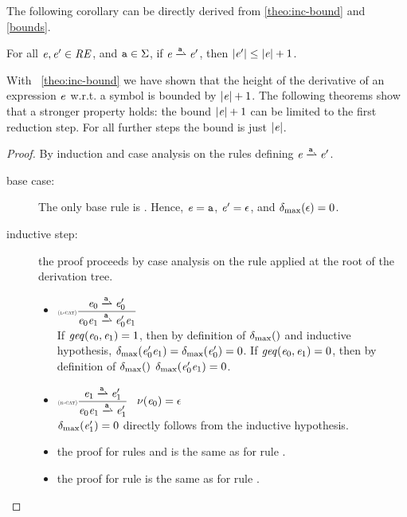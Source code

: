 The following corollary can be directly derived from \cref{theo:inc-bound} and \cref{bounds}.
\begin{corollary}
 For all $\mathit {e},\mathit {e}'\in\mathit {RE}$, and $\mathtt {a}\in\Sigma$, if $\re\parDer{\sym}\re'$, then ${\mid}{\mathit {e}'}{\mid}\leq{\mid}{\ensuremath{\mathit {e}}}{\mid}+1$.
\end{corollary}
With ~\cref{theo:inc-bound} we have shown that the height of the derivative of an expression $\mathit {e}$ w.r.t. a symbol is bounded by ${\mid}{\mathit {e}}{\mid}+1$.
The following theorems show that a stronger property holds: the bound ${\mid}{\mathit {e}}{\mid}+1$ can be limited to the first reduction step. For all further steps the bound is just
${\mid}{\mathit {e}}{\mid}$.
\begin{proof}
 By induction and case analysis on the rules defining $\re\parDer{\sym}\re'$.
 \begin{description}
  \item[base case:] The only base rule is .
   Hence, $\mathit {e}=\mathtt {a}$, $\mathit {e}'=\mathtt {\epsilon}$, and
   ${\delta_{\max}}({\mathtt {\epsilon}})=0$.
  \item[inductive step:] the proof proceeds by case analysis on the rule applied
   at the root of the derivation tree.
   \begin{itemize}
    \item $\Rule{l-cat}{\re_0\parDer{\sym}\re'_0}{\re_0\catop\re_1\parDer{\sym}\re'_0\catop\re_1}{}$\\[2ex]
          If $\mathit{geq}({\mathit {e}_0},{\mathit {e}_1})=1$, then by definition of ${\delta_{\max}}({})$ and inductive hypothesis, ${\delta_{\max}}({\mathit {e}'_0\mathit {e}_1})={\delta_{\max}}({\mathit {e}'_0})=0$.
          If $\mathit{geq}({\mathit {e}_0},{\mathit {e}_1})=0$, then by definition of ${\delta_{\max}}({})$ ${\delta_{\max}}({\mathit {e}'_0\mathit {e}_1})=0$.

    \item $\Rule{r-cat}{\re_1\parDer{\sym}\re'_1}{\re_0\catop\re_1\parDer{\sym}\re'_1}{\hasEps{\re_0}=\eps}$\\[2ex]
          ${\delta_{\max}}({\mathit {e}'_1})=0$ directly follows from the inductive hypothesis.

    \item the proof for rules  and  is the same as for rule .

    \item the proof for rule  is the same as for rule .
   \end{itemize}
 \end{description}
\end{proof}

